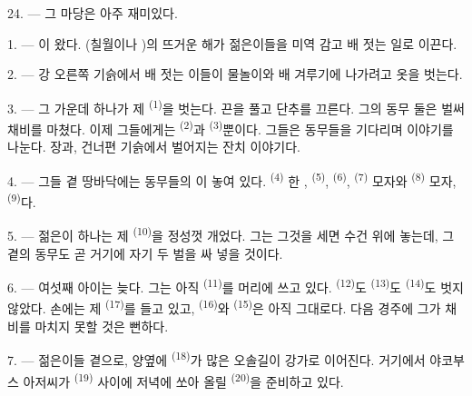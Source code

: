 24. --- 그 마당은 아주 재미있다.

\VUsaut{4.0mm}
\VUsaut{3.0mm}

\VUsaut{2.4mm}

\VUsaut{3.0mm}

1. --- 이 왔다. (칠월이나 )의 뜨거운 해가
젊은이들을 미역 감고 배 젓는 일로 이끈다.

2. --- 강 오른쪽 기슭에서 배 젓는 이들이 물놀이와 배 겨루기에 나가려고 옷을 벗는다.

3. --- 그 가운데 하나가 제  \textsuperscript{(1)}을 벗는다. 끈을 풀고
단추를 끄른다. 그의 동무 둘은 벌써 채비를 마쳤다. 이제 그들에게는 
\textsuperscript{(2)}과  \textsuperscript{(3)}뿐이다. 그들은 동무들을
기다리며 이야기를 나눈다. 장과, 건너편 기슭에서 벌어지는 잔치 이야기다.

4. --- 그들 곁 땅바닥에는 동무들의 이 놓여 있다. 
\textsuperscript{(4)} 한 ,  \textsuperscript{(5)},
 \textsuperscript{(6)},  \textsuperscript{(7)} 모자와
 \textsuperscript{(8)} 모자,  \textsuperscript{(9)}다.

5. --- 젊은이 하나는 제  \textsuperscript{(10)}을 정성껏 개었다. 그는
그것을 세면 수건 위에 놓는데, 그 곁의 동무도 곧 거기에 자기  두 벌을 싸
넣을 것이다.

6. --- 여섯째 아이는 늦다. 그는 아직  \textsuperscript{(11)}를 머리에
쓰고 있다.  \textsuperscript{(12)}도  \textsuperscript{(13)}도
 \textsuperscript{(14)}도 벗지 않았다. 손에는 제 
\textsuperscript{(17)}를 들고 있고,  \textsuperscript{(16)}와
 \textsuperscript{(15)}은 아직 그대로다. 다음 경주에 그가 채비를 마치지
못할 것은 뻔하다.

7. --- 젊은이들 곁으로, 양옆에  \textsuperscript{(18)}가 많은 오솔길이
강가로 이어진다. 거기에서 야코부스 아저씨가  \textsuperscript{(19)} 사이에
저녁에 쏘아 올릴  \textsuperscript{(20)}을 준비하고 있다.

\VUsaut{4.4mm}
\VUsaut{3.4mm}

